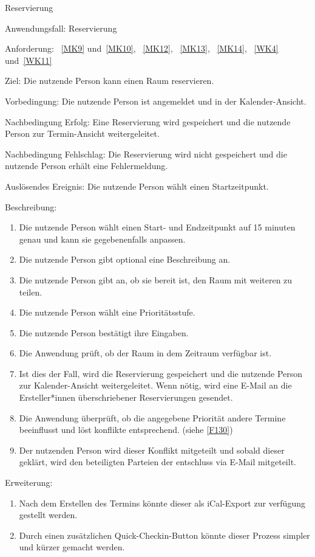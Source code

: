 \begin{function}{40}{Reservierung}
    \item[Anwendungsfall:] Reservierung
    \item[Anforderung:]~\ref{MK9} und~\ref{MK10}, ~\ref{MK12}, ~\ref{MK13}, ~\ref{MK14}, ~\ref{WK4} und~\ref{WK11}
    \item[Ziel:] Die nutzende Person kann einen Raum reservieren.
    \item[Vorbedingung:] Die nutzende Person ist angemeldet und in der Kalender-Ansicht.
    \item[Nachbedingung Erfolg:] Eine Reservierung wird gespeichert und die nutzende Person zur Termin-Ansicht weitergeleitet.
    \item[Nachbedingung Fehlschlag:] Die Reservierung wird nicht gespeichert und die nutzende Person erhält eine Fehlermeldung.
    \item[Auslösendes Ereignis:] Die nutzende Person wählt einen Startzeitpunkt.
    \item[Beschreibung:] ~
    \begin{enumerate}
        \item Die nutzende Person wählt einen Start- und Endzeitpunkt auf 15 minuten genau und kann sie gegebenenfalls anpassen.
        \item Die nutzende Person gibt optional eine Beschreibung an.
        \item Die nutzende Person gibt an, ob sie bereit ist, den Raum mit weiteren zu teilen.
        \item Die nutzende Person wählt eine Prioritätsstufe.
        \item Die nutzende Person bestätigt ihre Eingaben.
        \item Die Anwendung prüft, ob der Raum in dem Zeitraum verfügbar ist.
        \item Ist dies der Fall, wird die Reservierung gespeichert und die nutzende Person zur Kalender-Ansicht weitergeleitet.
        Wenn nötig, wird eine E-Mail an die Ersteller*innen überschriebener Reservierungen gesendet.
        \item Die Anwendung überprüft, ob die angegebene Priorität andere Termine beeinflusst und löst konflikte entsprechend. (siehe \ref{F130})
        \item Der nutzenden Person wird dieser Konflikt mitgeteilt und sobald dieser geklärt, wird den beteiligten Parteien der entschluss via E-Mail mitgeteilt.
    \end{enumerate}
    \item[Erweiterung:] ~
    \begin{enumerate}
        \item Nach dem Erstellen des Termins könnte dieser als iCal-Export zur verfügung gestellt werden.
        \item Durch einen zusätzlichen Quick-Checkin-Button könnte dieser Prozess simpler und kürzer gemacht werden.
    \end{enumerate}
\end{function}

